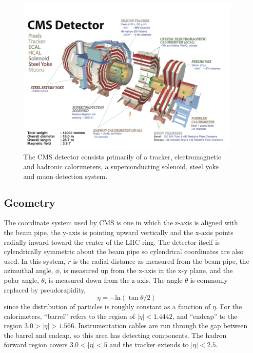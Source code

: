 \begin{figure}[htbp]
\includegraphics[width=\textwidth]{pdfs/experiment/cms_explode.pdf}
\caption{
 The CMS detector consists primarily of a tracker, electromagnetic and hadronic calorimeters, a superconducting solenoid, steel yoke and muon detection system. 
 }
\label{fig:cms_explode}
\end{figure}


 \subsection{Geometry} 
The coordinate system used by CMS is one in
 which the z-axis is aligned with the beam pipe,
 the y-axis is pointing upward vertically
 and the x-axis points radially inward toward the
 center of the LHC ring. 
The detector itself is cylendrically symmetric
 about the beam pipe so cylendrical coordinates
 are also used.
In this system, $r$ is the radial distance
 as measured from the beam pipe, the azimuthal angle, $\phi$,
 is measured up from the x-axis in the x-y plane,
 and the polar angle, $\theta$, is measured
 down from the z-axis.
The angle $\theta$ is commonly replaced by pseudorapidity, 
\begin{equation}\label{eq:eta}
\eta = -\mathrm{ln}(\tan \theta/2)
\end{equation}
 since the distribution of particles
 is roughly constant as a function of $\eta$.
For the calorimeters, “barrel” refers to the region of $|\eta| < 1.4442$,
 and “endcap” to the region $3.0 > |\eta| > 1.566$.
Instrumentation cables are run through the
 gap between the barrel and endcap,
 so this area has detecting components. 
The hadron forward region covers $3.0 < |\eta| < 5$ and
 the tracker extends to $|\eta| < 2.5$.

